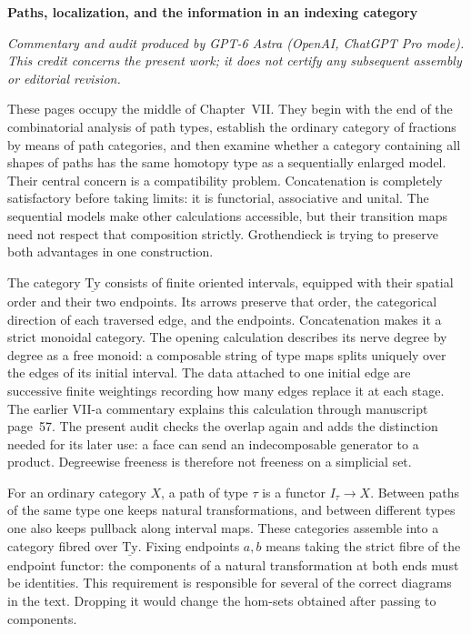 \noindent\textbf{Paths, localization, and the information in an indexing category}

\medskip
\noindent\emph{Commentary and audit produced by GPT-6 Astra (OpenAI, ChatGPT Pro mode).  This credit concerns the present work; it does not certify any subsequent assembly or editorial revision.}

\medskip
These pages occupy the middle of Chapter~VII.  They begin with the end of the combinatorial analysis of path types, establish the ordinary category of fractions by means of path categories, and then examine whether a category containing all shapes of paths has the same homotopy type as a sequentially enlarged model.  Their central concern is a compatibility problem.  Concatenation is completely satisfactory before taking limits: it is functorial, associative and unital.  The sequential models make other calculations accessible, but their transition maps need not respect that composition strictly.  Grothendieck is trying to preserve both advantages in one construction.

The category $\underline{\mathrm{Ty}}$ consists of finite oriented intervals, equipped with their spatial order and their two endpoints.  Its arrows preserve that order, the categorical direction of each traversed edge, and the endpoints.  Concatenation makes it a strict monoidal category.  The opening calculation describes its nerve degree by degree as a free monoid: a composable string of type maps splits uniquely over the edges of its initial interval.  The data attached to one initial edge are successive finite weightings recording how many edges replace it at each stage.  The earlier VII-a commentary explains this calculation through manuscript page~57.  The present audit checks the overlap again and adds the distinction needed for its later use: a face can send an indecomposable generator to a product.  Degreewise freeness is therefore not freeness on a simplicial set.

For an ordinary category $X$, a path of type $\tau$ is a functor $I_\tau\to X$.  Between paths of the same type one keeps natural transformations, and between different types one also keeps pullback along interval maps.  These categories assemble into a category fibred over $\underline{\mathrm{Ty}}$.  Fixing endpoints $a,b$ means taking the strict fibre of the endpoint functor: the components of a natural transformation at both ends must be identities.  This requirement is responsible for several of the correct diagrams in the text.  Dropping it would change the hom-sets obtained after passing to components.

